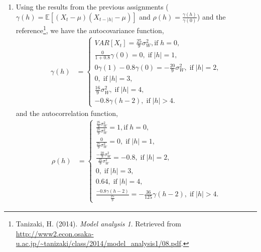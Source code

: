 \documentclass[10pt]{article}
\begin{document}
\begin{enumerate}[1)]
\item
Using the results from the previous assignments ($\gamma(h)=\mathbb{E}[(X_t-\mu)(X_{t-|h|}-\mu)]$ and $\rho(h)=\frac{\gamma(h)}{\gamma(0)}$) and the reference\footnote{ Tanizaki, H. (2014). \textit{Model analysis 1}. Retrieved from \url{http://www2.econ.osaka-u.ac.jp/~tanizaki/class/2014/model_analysis1/08.pdf}.}, we have the autocovariance function, %
\begin{align*}
\gamma(h)&=\left\{\begin{array}{ll}VAR[X_t]=\frac{25}{9}\sigma^2_W,\textrm{if}\;h=0,\\
\frac{0}{1+0.8}\gamma(0)=0,\;\textrm{if}\;|h|=1,\\
0\gamma(1)-0.8\gamma(0)=-\frac{20}{9}\sigma^2_W,\;\textrm{if}\;|h|=2,\\
0,\;\textrm{if}\;|h|=3,\\
\frac{16}{9}\sigma^2_W,\;\textrm{if}\;|h|=4,\\
-0.8\gamma(h-2),\;\textrm{if}\;|h|>4.\end{array}\right.
\end{align*}
and the autocorrelation function,
\begin{align*}
\rho(h)&=\left\{\begin{array}{ll}\frac{\frac{25}{9}\sigma^2_W}{\frac{25}{9}\sigma^2_W}=1,\textrm{if}\;h=0,\\
\frac{0}{\frac{25}{9}\sigma^2_W}=0,\;\textrm{if}\;|h|=1,\\
\frac{-\frac{20}{9}\sigma^2_W}{\frac{25}{9}\sigma^2_W}=-0.8,\;\textrm{if}\;|h|=2,\\
0,\;\textrm{if}\;|h|=3,\\
0.64,\;\textrm{if}\;|h|=4,\\
\frac{-0.8\gamma(h-2)}{\frac{25}{9}}=-\frac{36}{125}\gamma(h-2),\;\textrm{if}\;|h|>4.\end{array}\right.
\end{align*}
\vspace{3mm}


\end{enumerate}
\end{document}
